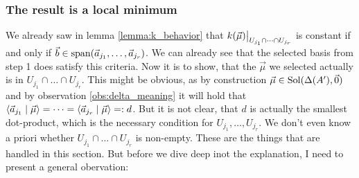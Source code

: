\subsubsection{The result is a local minimum}
We already saw in lemma \ref{lemma:k_behavior} that $\restrict{k(\vec\mu)}{U_{j_1} \cap \dots \cap U_{j_r}}$ is constant if and only if $\vec b \in \operatorname{span}(\vec a_{j_1}, \dots, \vec a_{j_r})$. We can already see that the selected basis from step 1 does satisfy this criteria. Now it is to show, that the $\vec\mu$ we selected actually is in $U_{j_1} \cap \dots \cap U_{j_r}$. This might be obvious, as by construction $\vec\mu \in \operatorname{Sol}(\Delta(A'), \vec 0)$ and by observation \ref{obs:delta_meaning} it will hold that $\langle \vec a_{j_1} \mid \vec\mu \rangle = \dots = \langle \vec a_{j_r} \mid \vec\mu \rangle =: d$. But it is not clear, that $d$ is actually the smallest dot-product, which is the necessary condition for $U_{j_1}, \dots, U_{j_r}$. We don't even know a priori whether ${U_{j_1} \cap \dots \cap U_{j_r}}$ is non-empty. These are the things that are handled in this section. But before we dive deep inot the explanation, I need to present a general obervation:

